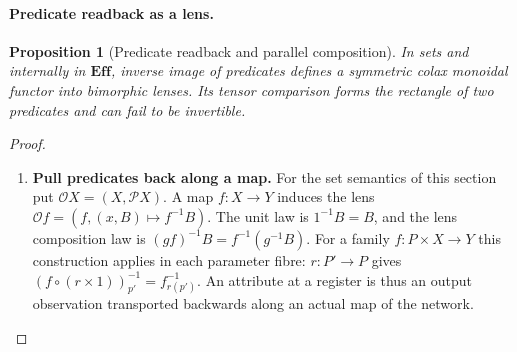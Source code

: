 \documentclass[11pt,a4paper]{article}
\newtheorem{comparison}{Proposition}
\theoremstyle{definition}
\theoremstyle{remark}\newaliascnt{remark}{theorem}
\newcommand{\E}{\mathbf{Eff}}
\numberwithin{equation}{section}
\begin{document}
\paragraph{Predicate readback as a lens.}
\begin{comparison}[Predicate readback and parallel composition]\label{comp:predicate}
In sets and internally in \(\E\), inverse image of predicates defines a symmetric colax monoidal functor into bimorphic lenses. Its tensor comparison forms the rectangle of two predicates and can fail to be invertible.
\end{comparison}
\begin{proof}\leavevmode
\begin{enumerate}[titledsteps]
    \item \textbf{Pull predicates back along a map.} For the set semantics of this section put \(\mathcal OX=(X,\mathcal P X)\). A map \(f:X\to Y\) induces the lens \(\mathcal Of=(f,(x,B)\mapsto f^{-1}B)\). The unit law is \(1^{-1}B=B\), and the lens composition law is \((gf)^{-1}B=f^{-1}(g^{-1}B)\). For a family \(f:P\times X\to Y\) this construction applies in each parameter fibre: \(r:P'\to P\) gives \((f\circ(r\times 1))_{p'}^{-1}=f_{r(p')}^{-1}\). An attribute at a register is thus an output observation transported backwards along an actual map of the network.



\end{enumerate}
\end{proof}
\end{document}
